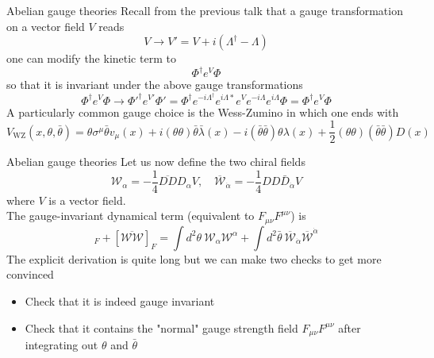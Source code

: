 \documentclass[10pt]{beamer}
\begin{document}
\begin{frame}{Abelian gauge theories}
Recall from the previous talk that a gauge transformation on a vector field $V$ reads
\begin{equation*}
    V \to V' = V + i(\Lambda^{\dagger} - \Lambda)
\end{equation*}
one can modify the kinetic term to
\begin{equation*}
    \Phi^{\dagger} e^V \Phi
\end{equation*}
so that it is invariant under the above gauge transformations
\begin{equation*}
    \Phi^{\dagger}e^V\Phi \to \Phi '^{\dagger}  e^{V'} \Phi ' = \Phi^{\dagger}e^{-i\Lambda^{\dagger}}e^{i\Lambda*}e^Ve^{-i\Lambda}e^{i\Lambda}\Phi = \Phi^{\dagger}e^V\Phi
\end{equation*}
A particularly common gauge choice is the Wess-Zumino in which one ends with
\begin{equation*}
    V_{\mathrm{WZ}}(x, \theta, \bar{\theta})=\theta \sigma^{\mu} \bar{\theta} v_{\mu}(x)+i(\theta \theta) \bar{\theta} \bar{\lambda}(x)-i(\bar{\theta} \bar{\theta}) \theta \lambda(x)+\frac{1}{2}(\theta \theta)(\bar{\theta} \bar{\theta}) D(x)
\end{equation*}
\end{frame}


\begin{frame}{Abelian gauge theories}
Let us now define the two chiral fields \\
\begin{equation*}
    \mathcal{W}_{\alpha}=-\frac{1}{4} \overline{D D} D_{\alpha} V, \quad \overline{\mathcal{W}}_{\dot{\alpha}} = -\frac{1}{4} D D \bar{D}_{\dot{\alpha}} V
\end{equation*}
where $V$ is a vector field. \\
The gauge-invariant dynamical term (equivalent to $F_{\mu\nu} F^{\mu\nu}$) is 
\begin{equation*}
   [\mathcal{W}\mathcal{W}]_F + [\overline{\mathcal{W}\mathcal{W}}]_F = \int d^2\theta \ \mathcal{W}_{\alpha} \mathcal{W}^{\alpha} + \int d^2\bar\theta \ \overline{\mathcal{W}}_{\dot\alpha} \overline{\mathcal{W}}^{\dot\alpha}
\end{equation*}
The explicit derivation is quite long but we can make two checks to get more convinced
\begin{itemize}
    \item Check that it is indeed gauge invariant
    \item Check that it contains the "normal" gauge strength field $F_{\mu\nu}F^{\mu\nu}$ after integrating out $\theta$ and $\bar\theta$
\end{itemize}
\end{frame}
\end{document}
